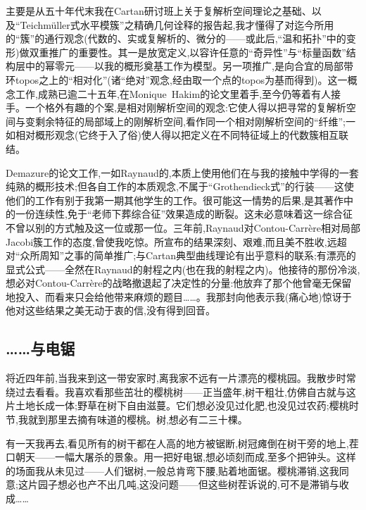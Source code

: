 
主要是从五十年代末我在Cartan研讨班上关于复解析空间理论之基础、以及“Teichmüller式水平模簇”之精确几何诠释的报告起,我才懂得了对迄今所用的“簇”的通行观念(代数的、实或复解析的、微分的——或此后,“温和拓扑”中的变形)做双重推广的重要性。其一是放宽定义,以容许任意的“奇异性”与“标量函数”结构层中的幂零元——以我的概形奠基工作为模型。\dmark{}另一项推广,是向合宜的局部带环topos之上的“相对化”(诸“绝对”观念,经由取一个点的topos为基而得到)。这一概念工作,成熟已逾二十五年,在Monique~Hakim的论文里着手,至今仍等着有人接手。一个格外有趣的个案,是相对刚解析空间的观念:它使人得以把寻常的复解析空间与变剩余特征的局部域上的刚解析空间,看作同一个相对刚解析空间的“纤维”;一如相对概形观念(它终于入了俗)使人得以把定义在不同特征域上的代数簇相互联结。


Demazure的论文工作,一如Raynaud的,本质上使用他们在与我的接触中学得的一套纯熟的概形技术;但各自工作的本质观念,不属于“Grothendieck式”的行装——这使他们的工作有别于我第一期其他学生的工作。很可能这一情势的后果,是其著作中的一份连续性,免于“老师下葬综合征”效果造成的断裂。这未必意味着这一综合征不曾以别的方式触及这一位或那一位。三年前,Raynaud对Contou-Carrère相对局部Jacobi簇工作的态度,曾使我吃惊。所宣布的结果深刻、艰难,而且美不胜收,远超对“众所周知”之事的简单推广;与Cartan典型曲线理论有出乎意料的联系;有漂亮的显式公式——全然在Raynaud的射程之内(也在我的射程之内)。他接待的那份冷淡,想必对Contou-Carrère的战略撤退起了决定性的分量:他放弃了那个他曾毫无保留地投入、而看来只会给他带来麻烦的题目……。我那封向他表示我(痛心地)惊讶于他对这些结果之美无动于衷的信,没有得到回音。

\subsection{……与电锯}


\dmark{}将近四年前,当我来到这一带安家时,离我家不远有一片漂亮的樱桃园。我散步时常绕过去看看。我喜欢看那些茁壮的樱桃树——正当盛年,树干粗壮,仿佛自古就与这片土地长成一体;野草在树下自由滋蔓。它们想必没见过化肥,也没见过农药;樱桃时节,我就到那里去摘有味道的樱桃。树,想必有二三十棵。

有一天我再去,看见所有的树干都在人高的地方被锯断,树冠瘫倒在树干旁的地上,茬口朝天——一幅大屠杀的景象。用一把好电锯,想必顷刻而成,至多个把钟头。这样的场面我从未见过——人们锯树,一般总肯弯下腰,贴着地面锯。樱桃滞销,这我同意;这片园子想必也产不出几吨,这没问题——但这些树茬诉说的,可不是滞销与收成……

